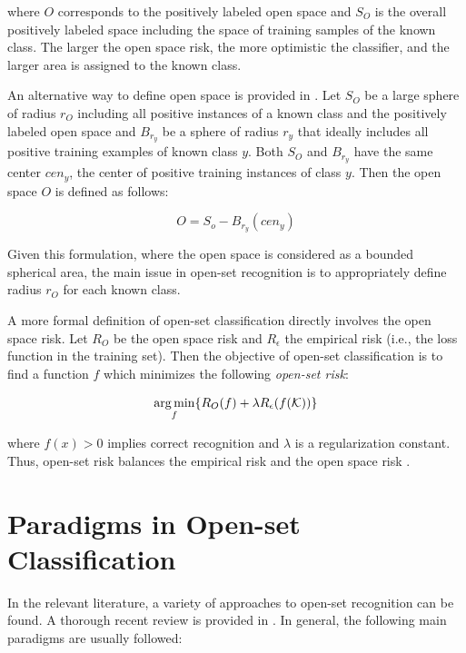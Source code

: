 \noindent
where $O$ corresponds to the positively labeled open space and $S_O$ is the overall positively labeled space including the space of training samples of the known class. The larger the open space risk, the more optimistic the classifier, and the larger area is assigned to the known class.  

An alternative way to define open space is provided in  \parencite{fei2016breaking}. Let $S_O$ be a large sphere of radius $r_O$ including all positive instances of a known class and the positively labeled open space and $B_{r_y}$ be a sphere of radius $r_y$ that ideally includes all positive training examples of known class $y$. Both $S_O$ and $B_{r_y}$ have the same center $cen_y$, the center of positive training instances of class $y$. Then the open space $O$ is defined as follows:

\begin{equation}\label{chap:eval_methods:eq:openspace_spherical_constrained}
	O = S_{o} - B_{r_{y}}(cen_{y})
\end{equation}

Given this formulation, where the open space is considered as a bounded spherical area, the main issue in open-set recognition is to appropriately define radius $r_O$ for each known class.

A more formal definition of open-set classification directly involves the open space risk. Let $R_{O}$ be the open space risk and $R_{\epsilon}$ the empirical risk (i.e., the loss function in the training set). Then the objective of open-set classification is to find a function $f$ which minimizes the following \textit{open-set risk}: 

\begin{equation}
\label{eq:open_space_risk}
\operatorname*{arg\,min}_{f} \{R_{O}(f ) + \lambda R_{\epsilon}(f (\mathcal{K}))\}
\end{equation}

\noindent where $f (x) > 0$ implies correct recognition and $\lambda$ is a regularization constant. Thus, open-set risk balances the empirical risk and the open space risk \parencite{geng2018recent}. 

\section{Paradigms in Open-set Classification}
\label{chap:openset:sec:Open_Set_Classification_Paradigms}

In the relevant literature, a variety of approaches to open-set recognition can be found. A thorough recent review is provided in \parencite{geng2018recent}. In general, the following main paradigms are usually followed:

